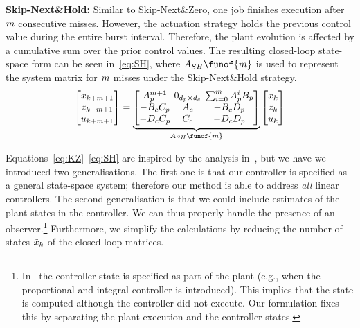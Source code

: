 \textbf{Skip-Next\&Hold: }%
%
Similar to Skip-Next\&Zero, one job finishes execution after $m$ consecutive misses.
However, the actuation strategy holds the previous control value during the entire burst interval.
Therefore, the plant evolution is affected by a cumulative sum over the prior control values.
The resulting closed-loop state-space form can be seen in~\eqref{eq:SH}, where $A_{SH}\funof{\nummisses}$ is used to represent the system matrix for $m$ misses under the Skip-Next\&Hold strategy.
%
\begin{equation}
\setlength\arraycolsep{2pt}
\label{eq:SH}
    \begin{bmatrix}
        x_{k+\nummisses+1} \\
        z_{k+\nummisses+1} \\
        u_{k+\nummisses+1}
    \end{bmatrix} = 
    \underbrace{\begin{bmatrix}
        A_p^{\nummisses+1}  & 0_{\numstatesplant \times \numstatesctl}  & \sum_{i=0}^\nummisses A_p^iB_p \\
        -B_cC_p             & A_c                                       & -B_cD_p \\
        -D_cC_p             & C_c                                       & -D_cD_p
    \end{bmatrix}}_{A_{SH}\funof{\nummisses}}
    \begin{bmatrix}
        x_{k} \\
        z_{k} \\
        u_{k}
    \end{bmatrix}
\end{equation}

Equations~\eqref{eq:KZ}--\eqref{eq:SH} are inspired by the analysis in~\cite{Maggio:2020}, but we have we introduced two generalisations.
The first one is that our controller is specified as a general state-space system; therefore our method is able to address \emph{all} linear controllers.
The second generalisation is that we could include estimates of the plant states in the controller.
We can thus properly handle the presence of an observer.\footnote{In~\cite{Maggio:2020} the controller state is specified as part of the plant (e.g., when the proportional and integral controller is introduced). This implies that the state is computed although the controller did not execute. Our formulation fixes this by separating the plant execution and the controller states.}
Furthermore, we simplify the calculations by reducing the number of states $\Tilde{x}_k$ of the closed-loop matrices.

